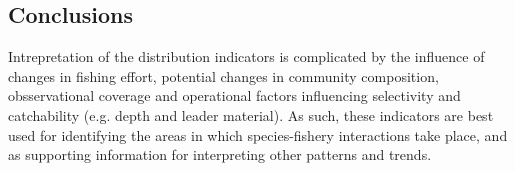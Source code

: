 \documentclass[12pt]{SCreport}
\begin{document}

         





      \begin{comment}
      \hl{The following points were noted from the life stage and sex distribution plots:
- Adult blue sharks were more common than juveniles in the waters off Hawaii and at latitudes of 20$^{\circ}$S this corresponds to the blue shark mating ground proposed by Nakano (1994); 

- The observed distributions of adult and juvenile oceanic whitetip and silky sharks are similar but samples of silky sharks were particularly skewed toward juveniles in tropical waters.
- Thresher sample sizes were small but were mainly comprised of juveniles in tropical areas.}
- Observer records of hammerhead sharks that include sex and length were extremely limited, the samples were proportionally more juvenilles in the tropical waters around Paupa New Guinea and Fiji.
-Oservations of porbeagle sharks are  limited to mid-year samples in the waters around Tasmania, where they tend to higher proportions of adults.
\end{comment}

\clearpage         
        
     
          
  \subsection{Conclusions}
  
  
Intrepretation of the   distribution indicators is complicated by the influence of changes in fishing effort,  potential  changes in community composition, obsservational coverage  and operational factors influencing selectivity and catchability (e.g. depth and leader material). As such, these indicators are best used for identifying the areas in which species-fishery interactions take place, and as supporting information for interpreting other patterns and trends. 
\end{document}
